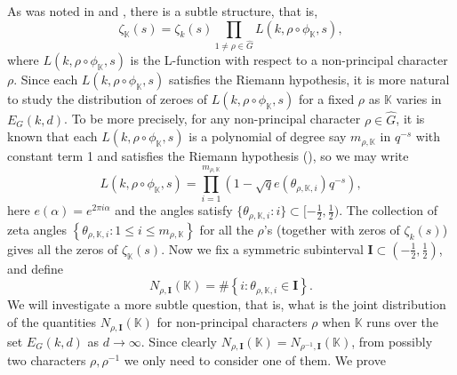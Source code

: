 \documentclass[12pt]{amsart}
\theoremstyle{plain}
\begin{document}
As was noted in \cite{xio} and \cite{buc3}, there is a subtle structure, that is,
\[\zeta_{{\mathbb K}}(s)=\zeta_k(s) \prod_{1 \ne \rho \in \widehat{G}} L(k,\rho \circ {\phi_{{\mathbb K}}},s),\]
where $L(k,\rho \circ {\phi_{{\mathbb K}}},s)$ is the L-function with respect to a non-principal character $\rho$. Since each $L(k,\rho \circ {\phi_{{\mathbb K}}},s)$ satisfies the Riemann hypothesis, it is more natural to study the distribution of zeroes of $L(k,\rho \circ {\phi_{{\mathbb K}}},s)$ for a fixed $\rho$ as ${{\mathbb K}}$ varies in $E_G(k,d)$. To be more precisely, for any non-principal character $\rho \in \widehat{G}$, it is known that each $L(k,\rho \circ {\phi_{{\mathbb K}}},s)$ is a polynomial of degree say $m_{\rho,{{\mathbb K}}}$ in $q^{-s}$ with constant term 1 and satisfies the Riemann hypothesis (\cite{ros}), so we may write
\[L(k,\rho \circ {\phi_{{\mathbb K}}},s)=\prod_{i=1}^{m_{\rho,{{\mathbb K}}}} \left(1-\sqrt{q} e(\theta_{\rho,{{\mathbb K}},i})q^{-s}\right), \]
here $e(\alpha)=e^{2 \pi i \alpha}$ and the angles satisfy $\{\theta_{\rho,{{\mathbb K}},i}:i\} \subset [-\frac{1}{2},\frac{1}{2})$. The collection of zeta angles $\left\{\theta_{\rho,{{\mathbb K}},i}: 1 \le i \le m_{\rho,{{\mathbb K}}}\right\}$ for all the $\rho$'s (together with zeros of $\zeta_k(s)$) gives all the zeros of $\zeta_{{\mathbb K}}(s)$.  Now we fix a symmetric subinterval ${{\mathbf I}} \subset (-\frac{1}{2},\frac{1}{2})$, and define
\[N_{\rho,{{\mathbf I}}}({{\mathbb K}})=\#\left\{i: \theta_{\rho,{{\mathbb K}},i} \in {{\mathbf I}}\right\}. \]
We will investigate a more subtle question, that is, what is the joint distribution of the quantities $N_{\rho,{{\mathbf I}}}({{\mathbb K}})$ for non-principal characters $\rho$ when ${{\mathbb K}}$ runs over the set $E_G(k,d)$ as $d \to \infty$. Since clearly $N_{\rho,{{\mathbf I}}}({{\mathbb K}})=N_{\rho^{-1},{{\mathbf I}}}({{\mathbb K}})$, from possibly two characters $\rho,\rho^{-1}$ we only need to consider one of them. We prove
\end{document}
